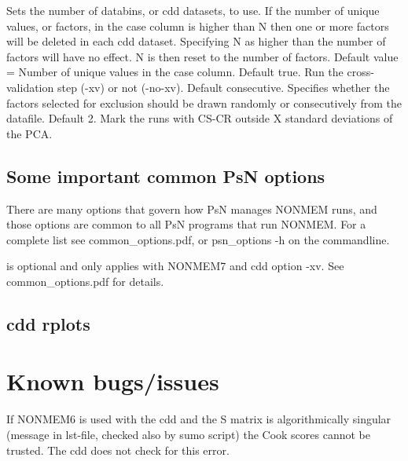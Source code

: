 \begin{optionlist}
Sets the number of databins, or cdd datasets, to use. If the number of unique values, or factors, in the case column is higher than N then one or more factors will be deleted in each cdd dataset. Specifying N as higher than the number of factors will have no effect. N is then reset to the number of factors. Default value = Number of unique values in the case column. 
\nextopt
{}
Default true. Run the cross-validation step (-xv) or not (-no-xv). 
\nextopt
{}
Default consecutive. Specifies whether the factors selected for exclusion should be drawn randomly or consecutively from the datafile. 
\nextopt
{}
Default 2. Mark the runs with CS-CR outside X standard deviations of the PCA. 
\nextopt
\end{optionlist}

\subsection{Some important common PsN options}
There are many options that govern how PsN manages NONMEM runs, and
those options are common to all PsN programs that run NONMEM.
For a complete list see common\_options.pdf, 
or psn\_options -h on the commandline.

\begin{optionlist}
is optional and only applies with NONMEM7 and cdd option -xv. 
See common\_options.pdf for details.
\nextopt
\end{optionlist}

\subsection{cdd rplots}
\newcommand{\rplotsconditions}{
If option -rplots is set $>=1$, a plot with Covariance ratios
vs Cook scores for each case, e.g. ID, will be generated. 
The default cdd rplots template 
requires no special R libraries.
If no pdf is generated,
see the .Rout file in the main run directory for error messages.}



\section{Known bugs/issues}

If NONMEM6 is used with the cdd and the S matrix is algorithmically singular (message in lst-file, checked also by sumo script) the Cook scores cannot  be trusted. The cdd does not check for this error. 


